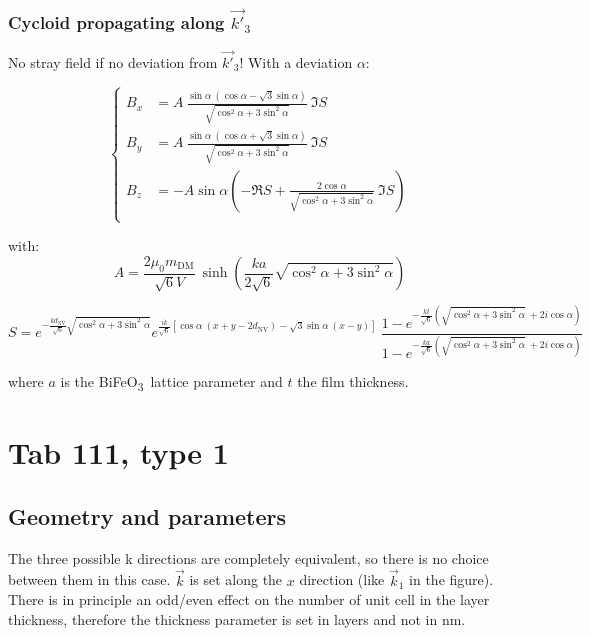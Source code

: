 \documentclass[a4paper,12pt]{article}
\newcommand{\BFO}{BiFeO\textsubscript{3}\ }
\begin{document}
  \subsubsection{Cycloid propagating along $\vec{k'}_3$}
  No stray field if no deviation from $\vec{k'}_3$! With a deviation $\alpha$:

  \begin{equation*}
  \left \lbrace
    \begin{aligned}
      B_x & =  A \ \frac{\sin \alpha \ (\cos \alpha - \sqrt{3} \sin \alpha)}{\sqrt{\cos^2 \alpha + 3 \sin^2 \alpha}} \ \Im{S}\\
      B_y &=    A \ \frac{\sin \alpha \ (\cos \alpha + \sqrt{3} \sin \alpha)}{\sqrt{\cos^2 \alpha + 3 \sin^2 \alpha}} \ \Im{S}\\
      B_z & =  -A \sin \alpha \left( -\Re{S} + \frac{2 \cos \alpha}{\sqrt{\cos^2 \alpha + 3 \sin^2 \alpha}} \ \Im{S} \right)\\
     \end{aligned}
   \right.
 \end{equation*}

 \vspace*{5mm}
 
 with:
 \[A = \frac{2\mu_0 m_\text{DM}}{\sqrt{6} V} \ \sinh \left(\frac{ka}{2\sqrt{6}} \sqrt{\cos^2 \alpha + 3 \sin^2 \alpha}\right) \]

 \[ S = e^{-\frac{kd_\text{NV}}{\sqrt{6}} \sqrt{\cos^2 \alpha + 3 \sin^2 \alpha}} e^{\frac{ik}{\sqrt{6}}[\cos \alpha \ (x+y-2d_\text{NV}) - \sqrt{3} \sin \alpha \ (x-y)]}   \        \frac{1-e^{-\frac{kt}{\sqrt{6}} (\sqrt{\cos^2 \alpha + 3 \sin^2 \alpha} \ +2i \cos \alpha) }}{1-e^{-\frac{ka}{\sqrt{6}} (\sqrt{\cos^2 \alpha + 3 \sin^2 \alpha} \ +2i \cos \alpha)}} \]

  where $a$ is the \BFO lattice parameter and $t$ the film thickness.
  
\clearpage
\section{Tab 111, type 1}
\subsection{Geometry and parameters}

The three possible k directions are completely equivalent, so there is no choice between them in this case. $\vec{k}$ is set along the $x$ direction (like $\vec{k}_1$ in the figure). There is in principle an odd/even effect on the number of unit cell in the layer thickness, therefore the thickness parameter is set in layers and not in \si{\nano\meter}.
\end{document}
